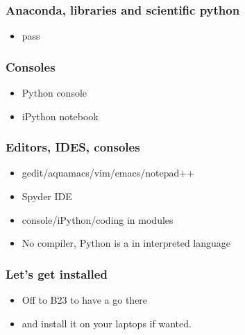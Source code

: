 \documentclass{beamer}
\begin{document}
\begin{frame}
\frametitle{Anaconda, libraries and scientific python}
\begin{itemize}
\item pass
\end{itemize}
\end{frame}

\begin{frame}
\frametitle{Consoles}
\begin{itemize}
\item Python console 
\item iPython notebook
\end{itemize}
\end{frame}


\begin{frame}
\frametitle{Editors, IDES, consoles}
\begin{itemize}
\item gedit/aquamacs/vim/emacs/notepad++ 
\item Spyder IDE
\item console/iPython/coding in modules
\item No compiler, Python is a in interpreted language
\end{itemize}
\end{frame}

\begin{frame}
\frametitle{Let's get installed}
\begin{itemize}
\item Off to B23 to have a go there 
\item and install it on your laptops if wanted.
\end{itemize}
\end{frame}
\end{document}
